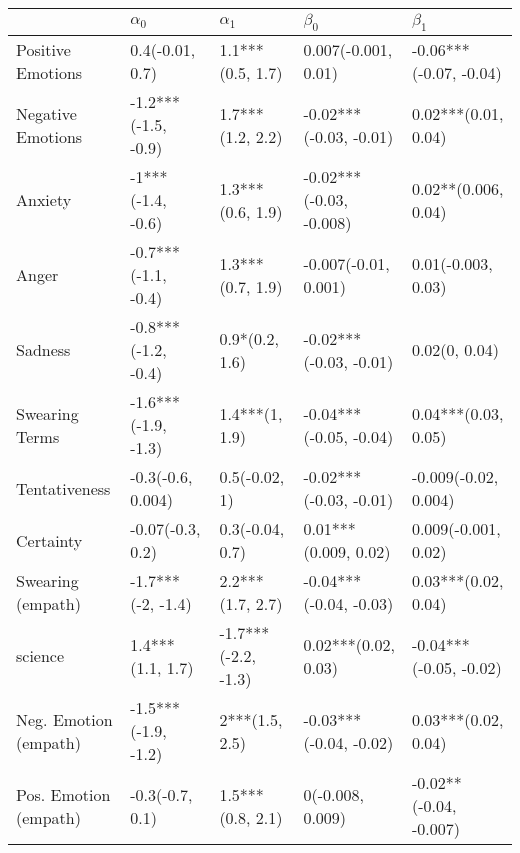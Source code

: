\begin{tabular}{lllll}
\toprule
{} &           $\alpha_0$ &           $\alpha_1$ &                $\beta_0$ &               $\beta_1$ \\
\midrule
Positive Emotions     &      0.4(-0.01, 0.7) &     1.1***(0.5, 1.7) &      0.007(-0.001, 0.01) &  -0.06***(-0.07, -0.04) \\
Negative Emotions     &  -1.2***(-1.5, -0.9) &     1.7***(1.2, 2.2) &   -0.02***(-0.03, -0.01) &     0.02***(0.01, 0.04) \\
Anxiety               &    -1***(-1.4, -0.6) &     1.3***(0.6, 1.9) &  -0.02***(-0.03, -0.008) &     0.02**(0.006, 0.04) \\
Anger                 &  -0.7***(-1.1, -0.4) &     1.3***(0.7, 1.9) &     -0.007(-0.01, 0.001) &      0.01(-0.003, 0.03) \\
Sadness               &  -0.8***(-1.2, -0.4) &       0.9*(0.2, 1.6) &   -0.02***(-0.03, -0.01) &           0.02(0, 0.04) \\
Swearing Terms        &  -1.6***(-1.9, -1.3) &       1.4***(1, 1.9) &   -0.04***(-0.05, -0.04) &     0.04***(0.03, 0.05) \\
Tentativeness         &    -0.3(-0.6, 0.004) &        0.5(-0.02, 1) &   -0.02***(-0.03, -0.01) &    -0.009(-0.02, 0.004) \\
Certainty             &     -0.07(-0.3, 0.2) &      0.3(-0.04, 0.7) &     0.01***(0.009, 0.02) &     0.009(-0.001, 0.02) \\
Swearing (empath)     &    -1.7***(-2, -1.4) &     2.2***(1.7, 2.7) &   -0.04***(-0.04, -0.03) &     0.03***(0.02, 0.04) \\
science               &     1.4***(1.1, 1.7) &  -1.7***(-2.2, -1.3) &      0.02***(0.02, 0.03) &  -0.04***(-0.05, -0.02) \\
Neg. Emotion (empath) &  -1.5***(-1.9, -1.2) &       2***(1.5, 2.5) &   -0.03***(-0.04, -0.02) &     0.03***(0.02, 0.04) \\
Pos. Emotion (empath) &      -0.3(-0.7, 0.1) &     1.5***(0.8, 2.1) &         0(-0.008, 0.009) &  -0.02**(-0.04, -0.007) \\
\bottomrule
\end{tabular}
